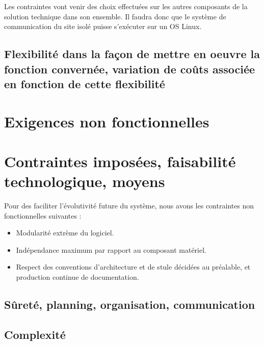 Les contraintes vont venir des choix effectuées sur les autres composants de la solution technique dans son ensemble. Il faudra donc que le système de communication du site isolé puisse s'exécuter sur un OS Linux.


\subsection{Flexibilité dans la façon de mettre en oeuvre la fonction convernée, variation de coûts associée en fonction de cette flexibilité}

\section{Exigences non fonctionnelles}

\section{Contraintes imposées, faisabilité technologique, moyens}

Pour des faciliter l'évolutivité future du système, nous avons les contraintes non fonctionnelles suivantes :

\begin{itemize}
\item Modularité extrème du logiciel.
\item Indépendance maximum par rapport au composant matériel.
\item Respect des conventions d'architecture et de stule décidées au préalable, et production continue de documentation.
\end{itemize}

\subsection{Sûreté, planning, organisation, communication}



\subsection{Complexité}



